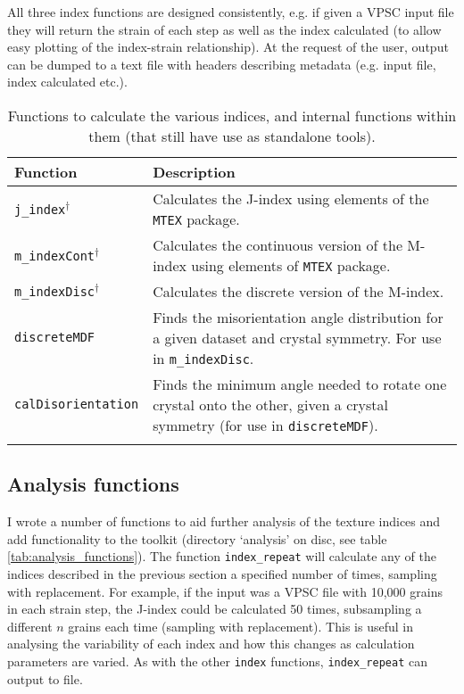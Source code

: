 \documentclass[a4paper,12pt,twoside]{report}
\numberwithin{equation}{chapter}
\begin{document}
All three index functions are designed consistently, e.g. if given a VPSC input file they will return the strain of each step as well as the index calculated (to allow easy plotting of the index-strain relationship). At the request of the user, output can be dumped to a text file with headers describing metadata (e.g. input file, index calculated etc.).                                                                                                                    

\begin{table}[h!] 
	\centering
	\caption[Functions: index calculation]{Functions to calculate the various indices, and internal functions within them (that still have use as standalone tools).}
	\noindent
	
\begin{tabularx}{\textwidth}{lX}

\hline
\hline
Function    & Description   \\ 
\hline
\hline
\texttt{j\_{}index}$^{\dagger}$ & Calculates the J-index using elements of the \texttt{MTEX} package. \\ 

\texttt{m\_{}indexCont}$^{\dagger}$ & Calculates the continuous version of the M-index using elements of \texttt{MTEX} package. \\

\texttt{m\_{}indexDisc}$^{\dagger}$ & Calculates the discrete version of the M-index. \\

\texttt{discreteMDF} & Finds the misorientation angle distribution for a given dataset and crystal symmetry. For use in \texttt{m\_{}indexDisc}. \\

\texttt{calDisorientation} & Finds the minimum angle needed to rotate one crystal onto the other, given a crystal symmetry (for use in \texttt{discreteMDF}). \\
\\
\hline
\hline

\end{tabularx}
\label{tab:index_functions}
\end{table}

\subsection{Analysis functions}

I wrote a number of functions to aid further analysis of the texture indices and add functionality to the toolkit (directory \lq{}analysis\rq{} on disc, see table \ref{tab:analysis_functions}). The function \texttt{index\_{}repeat} will calculate any of the indices described in the previous section a specified number of times, sampling with replacement. For example, if the input was a VPSC file with 10,000 grains in each strain step, the J-index could be calculated 50 times, subsampling a different $n$ grains each time (sampling with replacement). This is useful in analysing the variability of each index and how this changes as calculation parameters are varied.  As with the other \texttt{index} functions, \texttt{index\_{}repeat} can output to file.
\end{document}
